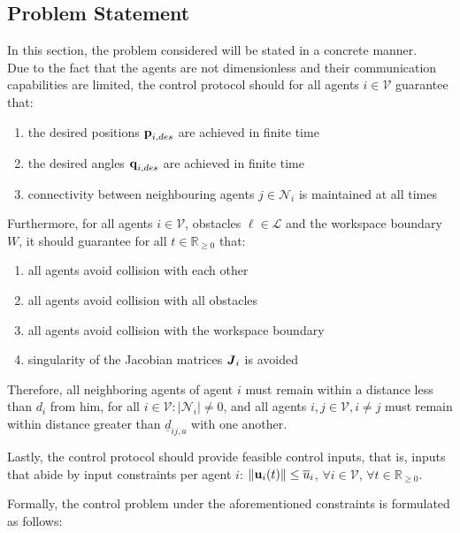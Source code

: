 \subsection{Problem Statement}

In this section, the problem considered will be stated in a concrete manner.\\

Due to the fact that the agents are not dimensionless and their communication
capabilities are limited, the control protocol should for all
agents $i \in \mathcal{V}$ guarantee that:
\begin{enumerate}
  \item the desired positions $\bm{\mathbf{p}}_{i,des}$ are achieved in finite time
  \item the desired angles $\bm{\mathbf{q}}_{i,des}$ are achieved in finite time
  \item connectivity between neighbouring agents $j \in \mathcal{N}_i$ is
    maintained at all times
\end{enumerate}
Furthermore, for all agents $i \in \mathcal{V}$, obstacles $\ell \in \mathcal{L}$
and the workspace boundary $W$, it should guarantee for all
$t\in\mathbb{R}_{\geq 0}$ that:
\begin{enumerate}
  \item all agents avoid collision with each other
  \item all agents avoid collision with all obstacles
  \item all agents avoid collision with the workspace boundary
  \item singularity of the Jacobian matrices $\bm{\mathit{J}}_i$ is avoided
\end{enumerate}

Therefore, all neighboring agents of agent $i$ must remain within a distance
less than $d_i$ from him, for all $i \in \mathcal{V}: |\mathcal{N}_i| \not= 0$,
and all agents $i, j\in \mathcal{V}, i \neq j$ must remain within distance
greater than $\underline{d}_{ij,a}$ with one another.

Lastly, the control protocol should provide feasible control inputs, that is,
inputs that abide by input constraints per agent $i$:
$\|\bm{\mathbf{u}}_i (t)\| \leq \overline{u}_i$, $\forall i \in \mathcal{V}$,
$\forall t \in \mathbb{R}_{\geq 0}$.

Formally, the control problem under the aforementioned constraints is
formulated as follows:

